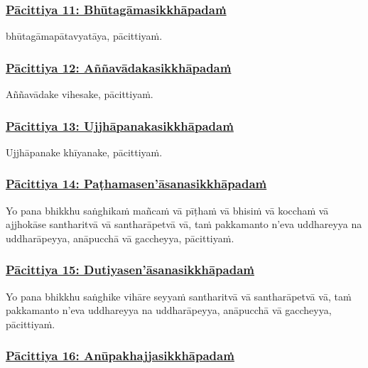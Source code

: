 \subsubsection*{\hyperref[exp11]{Pācittiya 11: Bhūtagāmasikkhāpadaṁ}}
\label{pac11}

bhūtagāmapātavyatāya, pācittiyaṁ.

\subsubsection*{\hyperref[exp12]{Pācittiya 12: Aññavādakasikkhāpadaṁ}}
\label{pac12}

Aññavādake vihesake, pācittiyaṁ.

\subsubsection*{\hyperref[exp13]{Pācittiya 13: Ujjhāpanakasikkhāpadaṁ}}
\label{pac13}

Ujjhāpanake khīyanake, pācittiyaṁ.

\subsubsection*{\hyperref[exp14]{Pācittiya 14: Paṭhamasen'āsanasikkhāpadaṁ}}
\label{pac14}

Yo pana bhikkhu saṅghikaṁ mañcaṁ vā pīṭhaṁ vā bhisiṁ vā kocchaṁ vā ajjhokāse santharitvā vā santharāpetvā vā, taṁ pakkamanto n'eva uddhareyya na uddharāpeyya, anāpucchā vā gaccheyya, pācittiyaṁ.

\subsubsection*{\hyperref[exp15]{Pācittiya 15: Dutiyasen'āsanasikkhāpadaṁ}}
\label{pac15}

Yo pana bhikkhu saṅghike vihāre seyyaṁ santharitvā vā santharāpetvā vā, taṁ pakkamanto n'eva uddhareyya na uddharāpeyya, anāpucchā vā gaccheyya, pācittiyaṁ.

\subsubsection*{\hyperref[exp16]{Pācittiya 16: Anūpakhajjasikkhāpadaṁ}}
\label{pac16}

